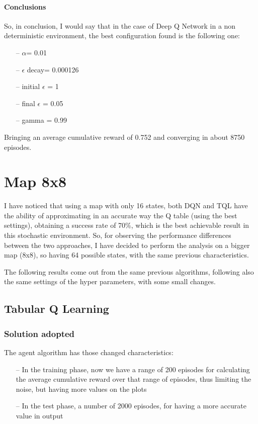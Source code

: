 \documentclass{article}
\begin{document}
\paragraph{Conclusions}

So, in conclusion, I would say that in the case of Deep Q Network in a non deterministic environment, the best configuration found is the following one:
\begin{itemize}
\item[--] $\alpha$= 0.01
\item[--] $\epsilon$ decay= 0.000126
\item[--] initial $\epsilon$ = 1
\item[--] final $\epsilon$ = 0.05
\item[--] gamma = 0.99
\end{itemize}

Bringing an average cumulative reward of 0.752 and converging in about 8750 episodes.   




\section{Map 8x8}

I have noticed that using a map with only 16 states, both DQN and TQL have the ability of approximating in an accurate way the Q table (using the best settings), obtaining a success rate of 70\%, which is the best achievable result in this stochastic environment.
So, for observing the performance differences between the two approaches, I have decided to perform the analysis on a bigger map (8x8), so having 64 possible states, with the same previous characteristics.

The following results come out from the same previous algorithms, following also the same settings of the hyper parameters, with some small changes.

\subsection{Tabular Q Learning}

\subsubsection{Solution adopted}

The agent algorithm has those changed characteristics:
\begin{itemize}
\item[--] In the training phase, now we have a range of 200 episodes for calculating the average cumulative reward over that range of episodes, thus limiting the noise, but having more values on the plots
\item[--] In the test phase, a number of 2000 episodes, for having a more accurate value in output
\end{itemize}
\end{document}
